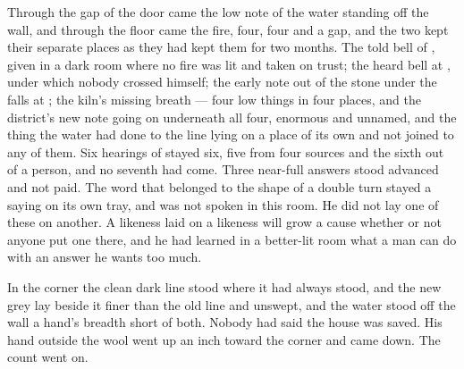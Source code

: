 Through the gap of the door came the low note of the water standing off the wall, and through the floor came the fire, four, four and a gap, and the two kept their separate places as they had kept them for two months. The told bell of , given in a dark room where no fire was lit and taken on trust; the heard bell at , under which nobody crossed himself; the early note out of the stone under the falls at ; the kiln's missing breath — four low things in four places, and the district's new note going on underneath all four, enormous and unnamed, and the thing the water had done to the line lying on a place of its own and not joined to any of them. Six hearings of  stayed six, five from four sources and the sixth out of a person, and no seventh had come. Three near-full answers stood advanced and not paid. The word that belonged to the shape of a double turn stayed a saying on its own tray, and was not spoken in this room. He did not lay one of these on another. A likeness laid on a likeness will grow a cause whether or not anyone put one there, and he had learned in a better-lit room what a man can do with an answer he wants too much.

In the corner the clean dark line stood where it had always stood, and the new grey lay beside it finer than the old line and unswept, and the water stood off the wall a hand's breadth short of both. Nobody had said the house was saved. His hand outside the wool went up an inch toward the corner and came down. The count went on.
